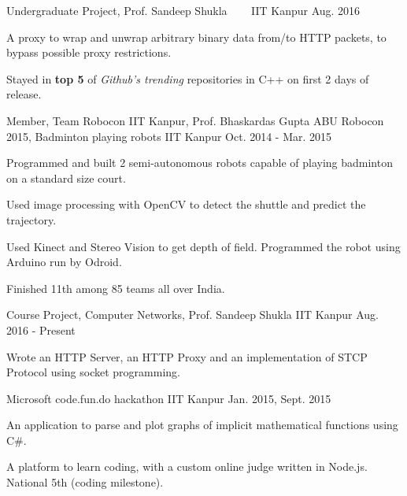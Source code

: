 \begin{cventries}
  \cventry
  {Undergraduate Project, Prof. Sandeep Shukla}
  {\href{https://github.com/sakshamsharma/HTTP-Over-Protocol}{}
    \ \ \ }
  {IIT Kanpur}
  {Aug. 2016}
  {
    \begin{cvitems}
    \item A proxy to wrap and unwrap arbitrary binary data from/to
      HTTP packets, to bypass possible proxy restrictions.
    \item Stayed in \textbf{top 5} of \textit{Github's trending}
      repositories in C++ on first 2 days of release.
    \end{cvitems}
  }

  \cventry
  {Member, Team Robocon IIT Kanpur, Prof. Bhaskardas Gupta}
  {ABU Robocon 2015, Badminton playing robots}
  {IIT Kanpur}
  {Oct. 2014 - Mar. 2015}
  {
    \begin{cvitems}
    \item Programmed and built 2 semi-autonomous robots
      capable of playing badminton on a standard size court.
    \item Used image processing with OpenCV to detect the shuttle
      and predict the trajectory.
    \item Used Kinect and Stereo Vision to get depth of
      field. Programmed the robot using Arduino run by Odroid.
    \item Finished 11th among 85 teams all over India.
    \end{cvitems}
  }

  \cventry
  {Course Project, Computer Networks, Prof. Sandeep Shukla}
  {\href{https://github.com/sakshamsharma/Network-Implementation}{
      }}
  {IIT Kanpur}
  {Aug. 2016 - Present}
  {
    \begin{cvitems}
    \item Wrote an HTTP Server, an HTTP Proxy and an implementation of
      STCP Protocol using socket programming.
    \end{cvitems}
  }


  {Microsoft code.fun.do hackathon}
  {IIT Kanpur}
  {Jan. 2015, Sept. 2015}
  {
    \begin{cvitems}
    \item An application to parse and plot graphs of implicit
      mathematical functions using C\#.
    \item A platform to learn coding, with a
      custom online judge written in Node.js. National 5th (coding milestone).
    \end{cvitems}
  }

\end{cventries}

